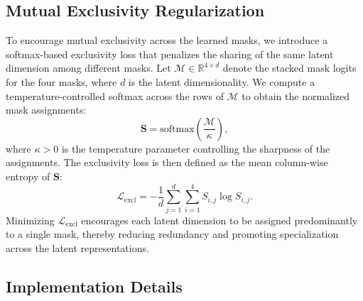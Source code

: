 \documentclass[doubleblind]{ecai}
\begin{document}
	
	
	
	

\subsection{Mutual Exclusivity Regularization}

To encourage mutual exclusivity across the learned masks, we introduce a softmax-based exclusivity loss that penalizes the sharing of the same latent dimension among different masks. Let $\mathcal{M} \in \mathbb{R}^{4 \times d}$ denote the stacked mask logits for the four masks, where $d$ is the latent dimensionality. We compute a temperature-controlled softmax across the rows of $\mathcal{M}$ to obtain the normalized mask assignments:
\begin{equation}
	\mathbf{S} = \text{softmax}\left(\frac{\mathcal{M}}{\kappa}\right),
\end{equation}
where $\kappa > 0$ is the temperature parameter controlling the sharpness of the assignments. The exclusivity loss is then defined as the mean column-wise entropy of $\mathbf{S}$:
\begin{equation}
	\mathcal{L}_{\text{excl}} = -\frac{1}{d} \sum_{j=1}^d \sum_{i=1}^4 S_{i,j} \log S_{i,j}.
\end{equation}
Minimizing $\mathcal{L}_{\text{excl}}$ encourages each latent dimension to be assigned predominantly to a single mask, thereby reducing redundancy and promoting specialization across the latent representations.

	
	\subsection{Implementation Details}
	\label{sec:details}
	
\end{document}
